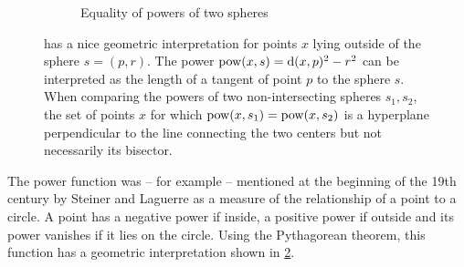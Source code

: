 \begin{figure}[tb]
\begin{subfigure}[b]{.55\linewidth}
        \caption{Equality of powers of two spheres}
        \label{sfig:chordal}
    \end{subfigure}
    \caption{ has a nice geometric interpretation for points $x$ lying outside of the sphere $s=(p, r)$. The power $\operatorname{pow}(x, s) = \operatorname{d}(x, p)^2 - r^2$ can be interpreted as the length of a tangent of point $p$ to the sphere $s$. When comparing the powers of two non-intersecting spheres $s_1, s_2$, the set of points $x$ for which $\operatorname{pow}(x, s_1) = \operatorname{pow}(x, s_2)$ is a hyperplane perpendicular to the line connecting the two centers but not necessarily its bisector.}
    \label{fig:power}
\end{figure}

The power function was -- for example -- mentioned at the beginning of the 19th century by Steiner \cite{steiner1881jacob} and Laguerre \cite{blaschke2013vorlesungen} as a measure of the relationship of a point to a circle.
A point has a negative power if inside, a positive power if outside and its power vanishes if it lies on the circle.
Using the Pythagorean theorem, this function has a geometric interpretation shown in \cref{fig:power}.

